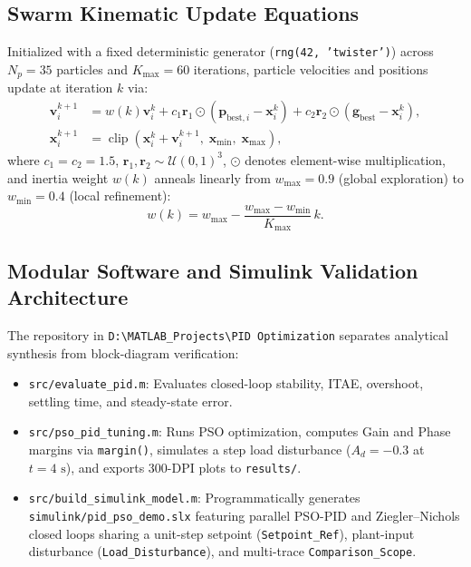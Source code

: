 \documentclass[11pt,a4paper]{article}
\begin{document}
\subsection{Swarm Kinematic Update Equations}
Initialized with a fixed deterministic generator (\texttt{rng(42, 'twister')}) across $N_p = 35$ particles and $K_{\max} = 60$ iterations, particle velocities and positions update at iteration $k$ via:
\begin{align}
  \mathbf{v}_i^{k+1} &= w(k)\mathbf{v}_i^k + c_1 \mathbf{r}_1 \odot (\mathbf{p}_{\text{best},i} - \mathbf{x}_i^k) + c_2 \mathbf{r}_2 \odot (\mathbf{g}_{\text{best}} - \mathbf{x}_i^k), \label{eq:pso_vel} \\
  \mathbf{x}_i^{k+1} &= \operatorname{clip}\!\left(\mathbf{x}_i^k + \mathbf{v}_i^{k+1},\; \mathbf{x}_{\min},\; \mathbf{x}_{\max}\right), \label{eq:pso_pos}
\end{align}
where $c_1 = c_2 = 1.5$, $\mathbf{r}_1, \mathbf{r}_2 \sim \mathcal{U}(0,1)^3$, $\odot$ denotes element-wise multiplication, and inertia weight $w(k)$ anneals linearly from $w_{\max} = 0.9$ (global exploration) to $w_{\min} = 0.4$ (local refinement):
\begin{equation}
  w(k) = w_{\max} - \frac{w_{\max} - w_{\min}}{K_{\max}}\,k.
\end{equation}

\subsection{Modular Software and Simulink Validation Architecture}
The repository in \texttt{D:\textbackslash MATLAB\_Projects\textbackslash PID Optimization} separates analytical synthesis from block-diagram verification:
\begin{itemize}[leftmargin=2em]
  \item \texttt{src/evaluate\_pid.m}: Evaluates closed-loop stability, ITAE, overshoot, settling time, and steady-state error.
  \item \texttt{src/pso\_pid\_tuning.m}: Runs PSO optimization, computes Gain and Phase margins via \texttt{margin()}, simulates a step load disturbance ($A_d = -0.3$ at $t = 4\text{ s}$), and exports 300-DPI plots to \texttt{results/}.
  \item \texttt{src/build\_simulink\_model.m}: Programmatically generates \texttt{simulink/pid\_pso\_demo.slx} featuring parallel PSO-PID and Ziegler--Nichols closed loops sharing a unit-step setpoint (\texttt{Setpoint\_Ref}), plant-input disturbance (\texttt{Load\_Disturbance}), and multi-trace \texttt{Comparison\_Scope}.
\end{itemize}
\end{document}
